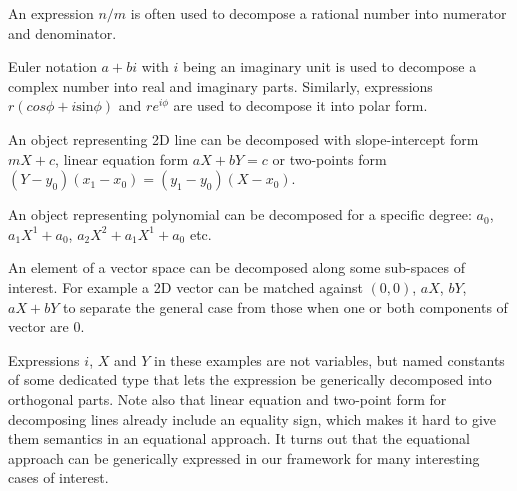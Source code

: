 \begin{compactitem}
\setlength{\itemsep}{0pt}
\setlength{\parskip}{0pt}
\item An expression $n/m$ is often used to decompose a rational number into 
      numerator and denominator.
\item Euler notation $a+bi$ with $i$ being an imaginary unit is used to 
      decompose a complex number into real and imaginary parts. Similarly, 
      expressions $r(cos \phi + i\mathrm{sin} \phi)$ and $re^{i\phi}$ are used to 
      decompose it into polar form.
\item An object representing 2D line can be decomposed with slope-intercept form 
      $mX+c$, linear equation form $aX+bY=c$ or two-points form 
      $(Y-y_0)(x_1-x_0)=(y_1-y_0)(X-x_0)$.
\item An object representing polynomial can be decomposed for a specific degree: 
      $a_0$, $a_1X^1+a_0$, $a_2X^2+a_1X^1+a_0$ etc.
\item An element of a vector space can be decomposed along some sub-spaces of 
      interest. For example a 2D vector can be matched against $(0,0)$, $aX$, 
      $bY$, $aX+bY$ to separate the general case from those when one or both
      components of vector are $0$.
\end{compactitem}

\noindent
Expressions $i$, $X$ and $Y$ in these examples are not variables, but named 
constants of some dedicated type that lets the expression be generically 
decomposed into orthogonal parts. Note also that linear equation and two-point 
form for decomposing lines already include an equality sign, which makes it 
hard to give them semantics in an equational approach. It turns out that the 
equational approach can be generically expressed in our framework for many 
interesting cases of interest.

%

